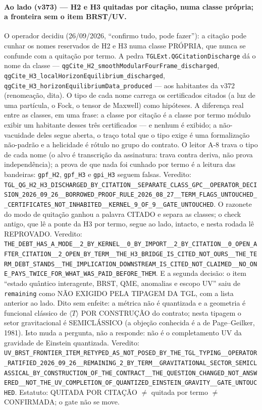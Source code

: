 \documentclass[11pt]{article}
\theoremstyle{definition}\newtheorem{deriv}{Derivação}
\begin{document}
\paragraph*{Ao lado (v373) --- H2 e H3 quitadas por citação, numa classe própria; a fronteira sem o item BRST/UV.} O operador decidiu (26/09/2026, ``confirmo tudo, pode fazer''): a citação pode cunhar os nomes reservados de H2 e H3 numa classe PRÓPRIA, que nunca se confunde com a quitação por termo. A pedra \texttt{TGLExt.QGCitationDischarge} dá o nome da classe --- \texttt{qgCite\_H2\_smoothModularFourFrame\_discharged}, \texttt{qgCite\_H3\_localHorizonEquilibrium\_discharged}, \texttt{qgCite\_H3\_horizonEquilibriumData\_produced} --- aos habitantes da v372 (renomeação, dita). O tipo de cada nome carrega os certificados citados (a luz de uma partícula, o Fock, o tensor de Maxwell) como hipóteses. A diferença real entre as classes, em uma frase: a classe por citação é a classe por termo módulo exibir um habitante desses três certificados --- e nenhum é exibido; a não-vacuidade deles segue aberta, o traço total que o tipo exige é uma formalização não-padrão e a helicidade é rótulo no grupo do contrato. O leitor A-8 trava o tipo de cada nome (o alvo é transcrição da assinatura: trava contra deriva, não prova independência); a prova de que nada foi cunhado por termo é a leitura das bandeiras: \texttt{gpf\_H2}, \texttt{gpf\_H3} e \texttt{gpi\_H3} seguem falsas. Veredito: \texttt{TGL\_QG\_H2\_H3\_DISCHARGED\_BY\_CITATION\_\_SEPARATE\_CLASS\_GPC\_\_OPERATOR\_DECISION\_2026\_09\_26\_\_BORROWED\_PROOF\_RULE\_2026\_08\_27\_\_TERM\_FLAGS\_UNTOUCHED\_\_CERTIFICATES\_NOT\_INHABITED\_\_KERNEL\_9\_OF\_9\_\_GATE\_UNTOUCHED}. O razonete do modo de quitação ganhou a palavra CITADO e separa as classes; o check antigo, que lê a ponte da H3 por termo, segue ao lado, intacto, e nesta rodada lê REPROVADO. Veredito: \texttt{THE\_DEBT\_HAS\_A\_MODE\_\_2\_BY\_KERNEL\_\_0\_BY\_IMPORT\_\_2\_BY\_CITATION\_\_0\_OPEN\_AFTER\_CITATION\_\_2\_OPEN\_BY\_TERM\_\_THE\_H3\_BRIDGE\_IS\_CITED\_NOT\_OURS\_\_THE\_TERM\_DEBT\_STANDS\_\_THE\_IMPLICATION\_DOWNSTREAM\_IS\_CITED\_NOT\_CLAIMED\_\_NO\_ONE\_PAYS\_TWICE\_FOR\_WHAT\_WAS\_PAID\_BEFORE\_THEM}. E a segunda decisão: o item ``estado quântico interagente, BRST, QME, anomalias e escopo UV'' saiu de \texttt{remaining} como NÃO EXIGIDO PELA TIPAGEM DA TGL, com a lista anterior ao lado. Dito sem enfeite: a métrica não é quantizada e a geometria é funcional clássico de $\langle T\rangle$ POR CONSTRUÇÃO do contrato; nesta tipagem o setor gravitacional é SEMICLÁSSICO (a objeção conhecida é a de Page--Geilker, 1981). Isto muda a pergunta, não a responde: não é o completamento UV da gravidade de Einstein quantizada. Veredito: \texttt{UV\_BRST\_FRONTIER\_ITEM\_RETYPED\_AS\_NOT\_POSED\_BY\_THE\_TGL\_TYPING\_\_OPERATOR\_RATIFIED\_2026\_09\_26\_\_REMAINING\_2\_BY\_TERM\_\_GRAVITATIONAL\_SECTOR\_SEMICLASSICAL\_BY\_CONSTRUCTION\_OF\_THE\_CONTRACT\_\_THE\_QUESTION\_CHANGED\_NOT\_ANSWERED\_\_NOT\_THE\_UV\_COMPLETION\_OF\_QUANTIZED\_EINSTEIN\_GRAVITY\_\_GATE\_UNTOUCHED}. Estatuto: QUITADA POR CITAÇÃO $\neq$ quitada por termo $\neq$ CONFIRMADA; o gate não se move.
\end{document}
